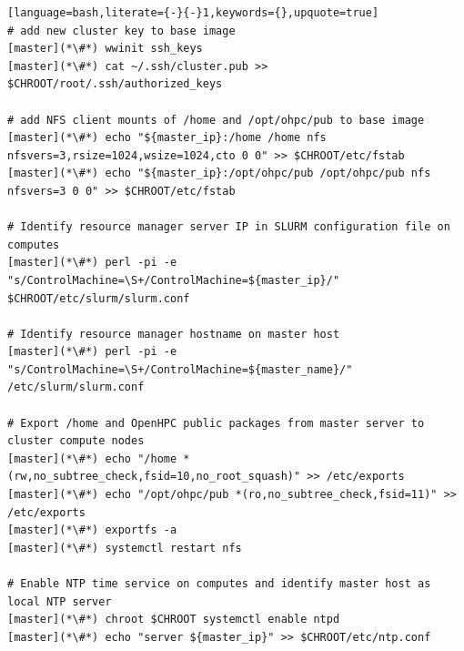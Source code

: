 \documentclass[letterpaper]{article}
\begin{document}
\begin{lstlisting}[language=bash,literate={-}{-}1,keywords={},upquote=true]
# add new cluster key to base image
[master](*\#*) wwinit ssh_keys
[master](*\#*) cat ~/.ssh/cluster.pub >> $CHROOT/root/.ssh/authorized_keys

# add NFS client mounts of /home and /opt/ohpc/pub to base image
[master](*\#*) echo "${master_ip}:/home /home nfs nfsvers=3,rsize=1024,wsize=1024,cto 0 0" >> $CHROOT/etc/fstab
[master](*\#*) echo "${master_ip}:/opt/ohpc/pub /opt/ohpc/pub nfs nfsvers=3 0 0" >> $CHROOT/etc/fstab

# Identify resource manager server IP in SLURM configuration file on computes
[master](*\#*) perl -pi -e "s/ControlMachine=\S+/ControlMachine=${master_ip}/" $CHROOT/etc/slurm/slurm.conf

# Identify resource manager hostname on master host
[master](*\#*) perl -pi -e "s/ControlMachine=\S+/ControlMachine=${master_name}/" /etc/slurm/slurm.conf

# Export /home and OpenHPC public packages from master server to cluster compute nodes
[master](*\#*) echo "/home *(rw,no_subtree_check,fsid=10,no_root_squash)" >> /etc/exports
[master](*\#*) echo "/opt/ohpc/pub *(ro,no_subtree_check,fsid=11)" >> /etc/exports
[master](*\#*) exportfs -a
[master](*\#*) systemctl restart nfs

# Enable NTP time service on computes and identify master host as local NTP server
[master](*\#*) chroot $CHROOT systemctl enable ntpd
[master](*\#*) echo "server ${master_ip}" >> $CHROOT/etc/ntp.conf
\end{lstlisting}



\end{document}
